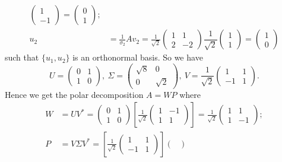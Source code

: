 \begin{Exercise}
\begin{enumerate}[(a)]
\begin{solution}
\begin{align*}
\begin{pmatrix}
			1 \\
			-1
			\end{pmatrix} = \begin{pmatrix}
			0 \\
			1
			\end{pmatrix}; \\
			u_2 
			&= \frac{1}{\sigma_2}A v_2 = \frac{1}{\sqrt{2}} \begin{pmatrix}
			1 & 1 \\
			2 & -2
			\end{pmatrix} \dfrac{1}{\sqrt{2}}\begin{pmatrix}
			1 \\
			1
			\end{pmatrix} = \begin{pmatrix}
			1 \\
			0
			\end{pmatrix}
			\end{align*}
			such that $\{u_1, u_2\}$ is an orthonormal basis.
			So we have
			$$
			U = \begin{pmatrix}
			0 & 1 \\
			1 & 0
			\end{pmatrix},~ \Sigma = \begin{pmatrix}
			\sqrt{8} & 0 \\
			0 & \sqrt{2}
			\end{pmatrix},~ V = \frac{1}{\sqrt{2}}\begin{pmatrix}
			1 & 1 \\
			-1 & 1
			\end{pmatrix}.
			$$
			Hence we get the polar decomposition $A = WP$ where
			\begin{align*}
			W 
			&= UV^* 
			=  \begin{pmatrix}
			0 & 1 \\
			1 & 0
			\end{pmatrix} \left[\frac{1}{\sqrt{2}}\begin{pmatrix}
			1 & -1 \\
			1 & 1
			\end{pmatrix} \right] = \frac{1}{\sqrt{2}}\begin{pmatrix}
			1 & 1 \\
			1 & -1
			\end{pmatrix}; \\
			P
			&= V\Sigma V^*
			= \left[\frac{1}{\sqrt{2}}\begin{pmatrix}
			1 & 1 \\
			-1 & 1
			\end{pmatrix}\right] \begin{pmatrix}

\end{pmatrix}
\end{align*}
\end{solution}
\end{enumerate}
\end{Exercise}
